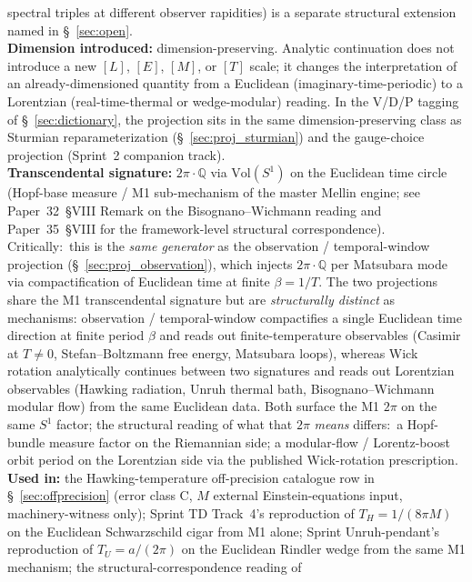 spectral triples at different observer rapidities) is a separate
structural extension named in \S~\ref{sec:open}.\\
\textbf{Dimension introduced:} dimension-preserving.  Analytic
continuation does not introduce a new $[L]$, $[E]$, $[M]$, or $[T]$
scale; it changes the interpretation of an already-dimensioned
quantity from a Euclidean (imaginary-time-periodic) to a Lorentzian
(real-time-thermal or wedge-modular) reading.  In the V/D/P tagging
of \S~\ref{sec:dictionary}, the projection sits in the same
dimension-preserving class as Sturmian reparameterization
(\S~\ref{sec:proj_sturmian}) and the gauge-choice projection
(Sprint~2 companion track).\\
\textbf{Transcendental signature:} $2\pi \cdot \mathbb{Q}$ via
$\mathrm{Vol}(S^1)$ on the Euclidean time circle (Hopf-base measure /
M1 sub-mechanism of the master Mellin engine; see Paper~32~§VIII
Remark on the Bisognano--Wichmann reading and Paper~35~§VIII for the
framework-level structural correspondence).  Critically:\ this is
the \emph{same generator} as the observation / temporal-window
projection (\S~\ref{sec:proj_observation}), which injects
$2\pi \cdot \mathbb{Q}$ per Matsubara mode via compactification of
Euclidean time at finite $\beta = 1/T$.  The two projections share
the M1 transcendental signature but are \emph{structurally distinct}
as mechanisms: observation / temporal-window compactifies a single
Euclidean time direction at finite period $\beta$ and reads out
finite-temperature observables (Casimir at $T \neq 0$,
Stefan--Boltzmann free energy, Matsubara loops), whereas Wick
rotation analytically continues between two signatures and reads out
Lorentzian observables (Hawking radiation, Unruh thermal bath,
Bisognano--Wichmann modular flow) from the same Euclidean data.
Both surface the M1 $2\pi$ on the same $S^1$ factor;
the structural reading of what that $2\pi$ \emph{means} differs:\
a Hopf-bundle measure factor on the Riemannian side; a
modular-flow / Lorentz-boost orbit period on the Lorentzian side
via the published Wick-rotation prescription.\\
\textbf{Used in:} the Hawking-temperature off-precision catalogue
row in \S~\ref{sec:offprecision} (error class C, $M$ external
Einstein-equations input, machinery-witness only); Sprint TD Track~4's
reproduction of $T_H = 1/(8\pi M)$ on the Euclidean Schwarzschild
cigar from M1 alone; Sprint Unruh-pendant's reproduction of
$T_U = a/(2\pi)$ on the Euclidean Rindler wedge from the same M1
mechanism; the structural-correspondence reading of
